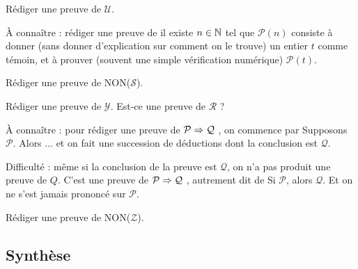 \documentclass[a4paper,11pt,DIV18,BCOR0mm]{scrartcl}
\newcommand{\aconnaitre}[1]{{\tiny{À connaître : #1}\par}}
\begin{document}
\begin{exercice}
 Rédiger une preuve de $\mathcal{U}$.
\end{exercice}

\aconnaitre{rédiger une preuve de \og il existe $n\in\mathbb{N}$ tel que $\mathcal{P}(n)$\fg{} consiste
à donner (sans donner d'explication sur comment on le trouve) un entier $t$ comme témoin, et à prouver (souvent une simple vérification
numérique) $\mathcal{P}(t)$.}

\begin{exercice}
 Rédiger une preuve de NON($\mathcal{S}$).
\end{exercice}

\begin{exercice}
 Rédiger une preuve de $\mathcal{Y}$. Est-ce une preuve de $\mathcal{R}$ ?
\end{exercice}

\aconnaitre{pour rédiger une preuve de \og $\mathcal{P}\Rightarrow\mathcal{Q}$ \fg,
on commence par \og Supposons $\mathcal{P}$. Alors ...\fg{} et on fait une 
succession de déductions dont la conclusion est $\mathcal{Q}$.

Difficulté : même si la conclusion de la preuve est $\mathcal{Q}$, on n'a pas produit une preuve de $Q$.
C'est une preuve de \og $\mathcal{P}\Rightarrow\mathcal{Q}$ \fg, autrement dit
de \og Si $\mathcal{P}$, alors $\mathcal{Q}$\fg. Et on ne s'est jamais prononcé sur $\mathcal{P}$.}


\begin{exercice}[facultatif]
 Rédiger une preuve de NON($\mathcal{Z}$).
\end{exercice}

\pagebreak

\subsection*{Synthèse}
\end{document}
